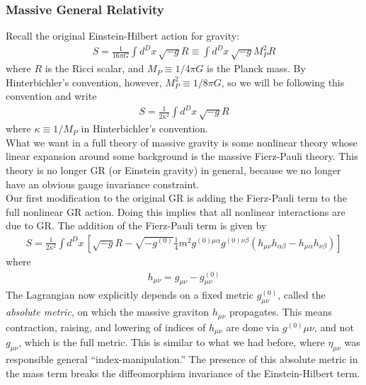 \documentclass{book}
\theoremstyle{definition}
\newcommand{\f}[2]{\frac{#1}{#2}}
\newcommand{\lp}{\left(}
\newcommand{\rp}{\right)}
\newcommand{\lb}{\left[}
\newcommand{\rb}{\right]}
\begin{document}
\subsubsection{Massive General Relativity}



Recall the original Einstein-Hilbert action for gravity:
\begin{align}
S = \f{1}{16\pi G}\int d^Dx\, \sqrt{-g}R\equiv \int d^Dx\, \sqrt{-g}M_P^2R
\end{align}
where $R$ is the Ricci scalar, and $M_P \equiv 1/4\pi G$ is the Planck mass. By Hinterbichler's convention, however, $M_P^2 \equiv 1/8\pi G$, so we will be following this convention and write
\begin{align}
S = \f{1}{2\kappa^2}\int d^Dx\, \sqrt{-g}R
\end{align}
where $\kappa  \equiv 1/M_P$ in Hinterbichler's convention. \\

What we want in a full theory of massive gravity is some nonlinear theory whose linear expansion around some background is the massive Fierz-Pauli theory. This theory is no longer GR (or Einstein gravity) in general, because we no longer have an obvious gauge invariance constraint.\\

Our first modification to the original GR is adding the Fierz-Pauli term to the full nonlinear GR action. Doing this implies that all nonlinear interactions are due to GR. The addition of the Fierz-Pauli term is given by
\begin{align}
\boxed{S = \f{1}{2\kappa^2}\int d^Dx\, \lb \sqrt{-g}R - \sqrt{-g^{(0)}}\f{1}{4}m^2 g^{(0)\mu\alpha}g^{(0)\nu\beta}\lp h_{\mu\nu}h_{\alpha\beta} - h_{\mu\alpha}h_{\nu\beta} \rp \rb}
\end{align}
where 
\begin{align}
\boxed{h_{\mu\nu} = g_{\mu\nu} - g^{(0)}_{\mu\nu}}
\end{align}
The Lagrangian now explicitly depends on a fixed metric $g^{(0)}_{\mu\nu}$, called the \textit{absolute metric}, on which the massive graviton $h_{\mu\nu}$ propagates. This means contraction, raising, and lowering of indices of $h_{\mu\nu}$ are done via $g^{(0)}_{}\mu\nu$, and not $g_{\mu\nu}$, which is the full metric. This is similar to what we had before, where $\eta_{\mu\nu}$ was responsible general ``index-manipulation.'' The presence of this absolute metric in the mass term breaks the diffeomorphism invariance of the Einstein-Hilbert term. \\
\end{document}
